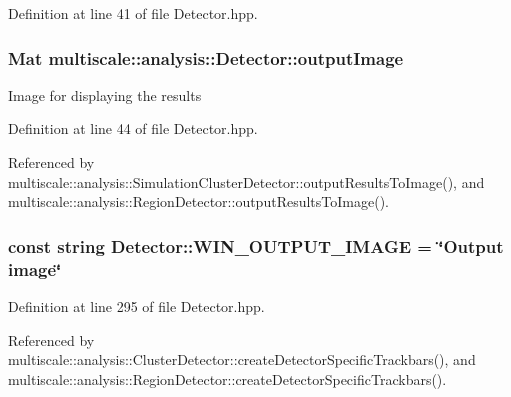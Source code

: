 \-Definition at line 41 of file \-Detector.\-hpp.

\hypertarget{classmultiscale_1_1analysis_1_1Detector_a144e080a3af03c9bf3d8a80315823c86}{
\subsubsection[{output\-Image}]{\setlength{\rightskip}{0pt plus 5cm}\-Mat {\bf multiscale\-::analysis\-::\-Detector\-::output\-Image}}}\label{classmultiscale_1_1analysis_1_1Detector_a144e080a3af03c9bf3d8a80315823c86}
\-Image for displaying the results 

\-Definition at line 44 of file \-Detector.\-hpp.



\-Referenced by multiscale\-::analysis\-::\-Simulation\-Cluster\-Detector\-::output\-Results\-To\-Image(), and multiscale\-::analysis\-::\-Region\-Detector\-::output\-Results\-To\-Image().

\hypertarget{classmultiscale_1_1analysis_1_1Detector_a883b5de8d273a2bfab31e45bc285c78d}{
\subsubsection[{\-W\-I\-N\-\_\-\-O\-U\-T\-P\-U\-T\-\_\-\-I\-M\-A\-G\-E}]{\setlength{\rightskip}{0pt plus 5cm}const string {\bf \-Detector\-::\-W\-I\-N\-\_\-\-O\-U\-T\-P\-U\-T\-\_\-\-I\-M\-A\-G\-E} = \char`\"{}\-Output {\bf image}\char`\"{}}}\label{classmultiscale_1_1analysis_1_1Detector_a883b5de8d273a2bfab31e45bc285c78d}


\-Definition at line 295 of file \-Detector.\-hpp.



\-Referenced by multiscale\-::analysis\-::\-Cluster\-Detector\-::create\-Detector\-Specific\-Trackbars(), and multiscale\-::analysis\-::\-Region\-Detector\-::create\-Detector\-Specific\-Trackbars().

